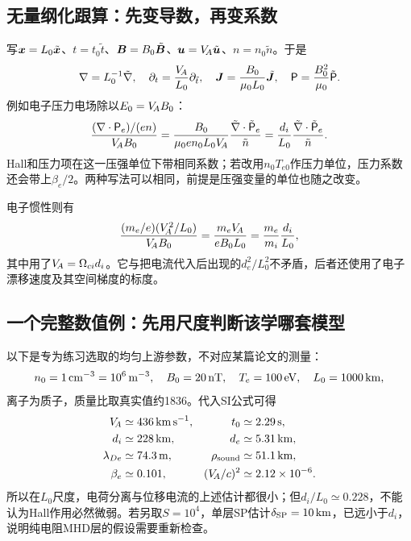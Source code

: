\documentclass[UTF8,a4paper,11pt,openany,fontset=fandol]{ctexbook}
\begin{document}
\subsection{无量纲化跟算：先变导数，再变系数}
写$\bm{x}=L_0\tilde{\bm{x}}$、$t=t_0\tilde t$、$\bm{B}=B_0\tilde{\bm{B}}$、$\bm{u}=V_{\!A}\tilde{\bm{u}}$、$n=n_0\tilde n$。于是
\begin{equation}
 \nabla=L_0^{-1}\tilde{\nabla},\quad
 \partial_t={V_{\!A}\over L_0}\partial_{\tilde t},\quad
 \bm{J}={B_0\over\mu_0L_0}\tilde{\bm{J}},\quad
 \mathsf P={B_0^2\over\mu_0}\tilde{\mathsf P}.
\end{equation}
例如电子压力电场除以$E_0=V_{\!A} B_0$：
\begin{equation}
 {(\nabla\cdot\mathsf P_e)/(en)\over V_{\!A}B_0}
 ={B_0\over\mu_0en_0L_0V_{\!A}}
 {\tilde{\nabla}\cdot\tilde{\mathsf P}_e\over\tilde n}
 ={d_i\over L_0}
 {\tilde{\nabla}\cdot\tilde{\mathsf P}_e\over\tilde n}.
\end{equation}
Hall和压力项在这一压强单位下带相同系数；若改用$n_0T_{e0}$作压力单位，压力系数还会带上$\beta_e/2$。两种写法可以相同，前提是压强变量的单位也随之改变。

电子惯性则有
\begin{equation}
 {(m_e/e)(V_{\!A}^2/L_0)\over V_{\!A}B_0}
 ={m_eV_{\!A}\over eB_0L_0}
 ={m_e\over m_i}{d_i\over L_0},
\end{equation}
其中用了$V_{\!A}=\Omega_{ci}d_i$。它与把电流代入后出现的$d_e^2/L_0^2$不矛盾，后者还使用了电子漂移速度及其空间梯度的标度。

\subsection{一个完整数值例：先用尺度判断该学哪套模型}
以下是专为练习选取的均匀上游参数，不对应某篇论文的测量：
\begin{equation}
 n_0=1\,{\rm cm^{-3}}=10^6\,{\rm m^{-3}},\quad
 B_0=20\,{\rm nT},\quad T_e=100\,{\rm eV},\quad
 L_0=1000\,{\rm km},
\end{equation}
离子为质子，质量比取真实值约1836。代入SI公式可得
\begin{align}
 V_{\!A}&\simeq436\,{\rm km\,s^{-1}},&
 t_0&\simeq2.29\,{\rm s},\\
 d_i&\simeq228\,{\rm km},&
 d_e&\simeq5.31\,{\rm km},\\
 \lambda_{De}&\simeq74.3\,{\rm m},&
 \rho_{\rm sound}&\simeq51.1\,{\rm km},\\
 \beta_e&\simeq0.101,&
 (V_{\!A}/c)^2&\simeq2.12\times10^{-6}.
\end{align}
所以在$L_0$尺度，电荷分离与位移电流的上述估计都很小；但$d_i/L_0\simeq0.228$，不能认为Hall作用必然微弱。若另取$S=10^4$，单层SP估计$\delta_{\rm SP}=10\,{\rm km}$，已远小于$d_i$，说明纯电阻MHD层的假设需要重新检查。
\end{document}
